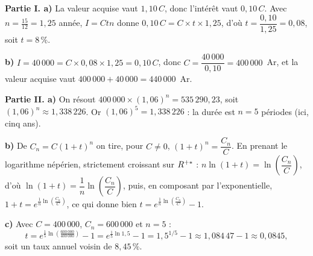 \begin{corrige}[annales]
\textbf{Partie I. a)} La valeur acquise vaut $1{,}10\,C$, donc l'intérêt
vaut $0{,}10\,C$. Avec $n = \frac{15}{12} = 1{,}25$ année,
$I = Ctn$ donne $0{,}10\,C = C \times t \times 1{,}25$, d'où
$t = \dfrac{0{,}10}{1{,}25} = 0{,}08$, soit $t = 8\,\%$.

\textbf{b)} $I = 40\,000 = C \times 0{,}08 \times 1{,}25 = 0{,}10\,C$, donc
$C = \dfrac{40\,000}{0{,}10} = 400\,000$~Ar, et la valeur acquise vaut
$400\,000+40\,000 = 440\,000$~Ar.

\textbf{Partie II. a)} On résout $400\,000 \times (1{,}06)^{n}
= 535\,290{,}23$, soit $(1{,}06)^{n} \approx 1{,}338\,226$. Or
$(1{,}06)^{5} = 1{,}338\,226$ : la durée est $n = 5$ périodes (ici, cinq
ans).

\textbf{b)} De $C_{n} = C(1+t)^{n}$ on tire, pour $C \neq 0$,
$(1+t)^{n} = \dfrac{C_{n}}{C}$. En prenant le logarithme népérien, strictement
croissant sur $R^{+*}$ :
$n\ln(1+t) = \ln\!\left(\dfrac{C_{n}}{C}\right)$, d'où
$\ln(1+t) = \dfrac1n\ln\!\left(\dfrac{C_{n}}{C}\right)$, puis, en composant
par l'exponentielle,
$1+t = e^{\frac1n\ln\left(\frac{C_{n}}{C}\right)}$, ce qui donne bien
$t = e^{\frac1n\ln\left(\frac{C_{n}}{C}\right)}-1$.

\textbf{c)} Avec $C = 400\,000$, $C_{n} = 600\,000$ et $n = 5$ :
\[
  t = e^{\frac15\ln\left(\frac{600\,000}{400\,000}\right)}-1
  = e^{\frac15\ln1{,}5}-1
  = 1{,}5^{1/5}-1 \approx 1{,}084\,47-1 \approx 0{,}0845,
\]
soit un taux annuel voisin de $8{,}45\,\%$.
\end{corrige}

